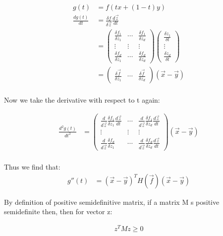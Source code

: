 \documentclass[twoside,11pt]{homework}
\begin{document}
\begin{align*}
	g(t) &= f(tx+(1-t)y)\\
	\frac{dg(t)}{dt} &= \frac{\delta f }{\delta \vec{z}} \frac{d\vec{z}}{dt}\\
	&=\begin{pmatrix}
\frac{\delta f_1}{\delta z_1} & \cdots & \frac{\delta f_1}{\delta z_d} \\
\vdots  & \vdots  &  \vdots  \\
\frac{\delta f_d}{\delta z_1} & \cdots & \frac{\delta f_d}{\delta z_d}
\end{pmatrix} \begin{pmatrix}
\frac{\delta z_1}{\delta t}\\
\vdots \\
\frac{\delta z_d}{\delta t}
\end{pmatrix}\\
&= \begin{pmatrix}
\frac{\delta \vec{f}}{\delta z_1} & \cdots & \frac{\delta \vec{f}}{\delta z_d}
\end{pmatrix}(\vec{x}-\vec{y})\\
\end{align*}


Now we take the derivative with respect to t again:

\begin{align*}
	\frac{d^2g(t)}{dt^2}
	&=\begin{pmatrix}
\frac{d}{d\vec{z}}\frac{\delta f_1}{\delta z_1}\frac{d\vec{z}}{dt} & \cdots & \frac{d}{d\vec{z}}\frac{\delta f_1}{\delta z_d}\frac{d\vec{z}}{dt} \\
\vdots  & \vdots  &  \vdots  \\
\frac{d}{d\vec{z}}\frac{\delta f_d}{\delta z_1} & \cdots & \frac{d}{d\vec{z}}\frac{\delta f_d}{\delta z_d}\frac{d\vec{z}}{dt}
\end{pmatrix} (\vec{x}-\vec{y})\\
\end{align*}


Thus we find that:
\begin{align*}
	g''(t) &=(\vec{x}-\vec{y})^TH(\vec{f})(\vec{x}-\vec{y})
\end{align*}

By definition of positive semidefinitive matrix, if a matrix M s positive semidefinite then, then for vector z:

\begin{align*}
	z^TMz \geq 0
\end{align*}
\end{document}
